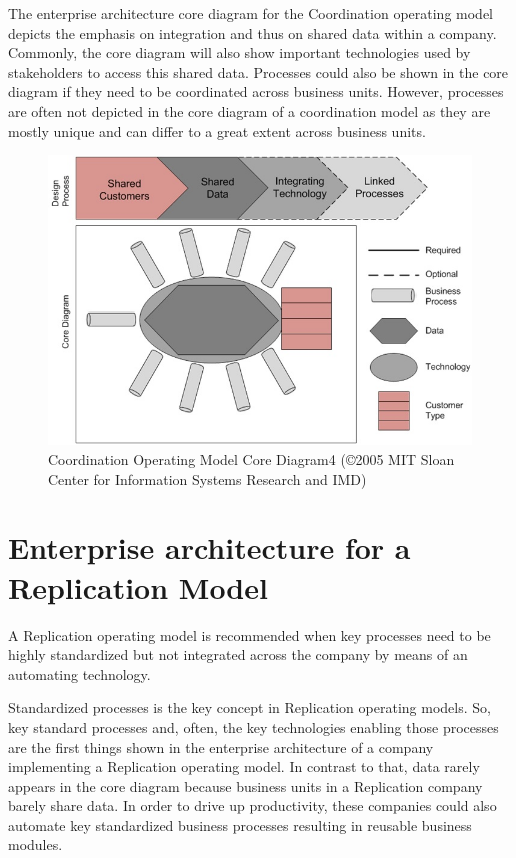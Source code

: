 The enterprise architecture core diagram for the Coordination operating model depicts the emphasis on integration
and thus on shared data within a company.
Commonly, the core diagram will also show important technologies used by stakeholders to access this shared data.
Processes could also be shown in the core diagram if they need to be coordinated across business units.
However, processes are often not depicted in the core diagram of a coordination model as they are mostly unique
and can differ to a great extent across business units.

\begin{figure}[ht]
    \centering
    \includegraphics[width=\textwidth]{../images/coordination-operating-model-core-diagram4.jpg}
    \caption{Coordination Operating Model Core Diagram4 (©2005 MIT Sloan Center for Information Systems Research and IMD)}
    \label{fig:ekgmm-ea-coordination-operating-model-core-diagram4}
\end{figure}

\section*{Enterprise architecture for a Replication Model}

A Replication operating model is recommended when key processes need to be highly standardized but not integrated
across the company by means of an automating technology.

Standardized processes is the key concept in Replication operating models.
So, key standard processes and, often, the key technologies enabling those processes are the first things shown
in the enterprise architecture of a company implementing a Replication operating model.
In contrast to that, data rarely appears in the core diagram because business units in a Replication company
barely share data.
In order to drive up productivity, these companies could also automate key standardized business processes resulting
in reusable business modules.

